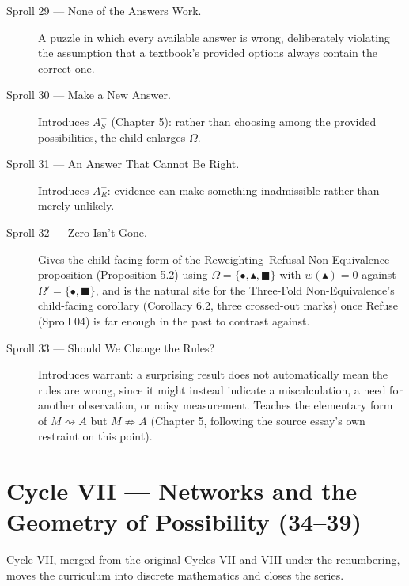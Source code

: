 \documentclass[11pt,twoside]{book}
\begin{document}
\begin{description}
\item[Sproll 29 --- None of the Answers Work.] A puzzle in which every available answer is wrong, deliberately violating the assumption that a textbook's provided options always contain the correct one.
\item[Sproll 30 --- Make a New Answer.] Introduces $A_S^+$ (Chapter 5): rather than choosing among the provided possibilities, the child enlarges $\Omega$.
\item[Sproll 31 --- An Answer That Cannot Be Right.] Introduces $A_R^-$: evidence can make something inadmissible rather than merely unlikely.
\item[Sproll 32 --- Zero Isn't Gone.] Gives the child-facing form of the Reweighting--Refusal Non-Equivalence proposition (Proposition 5.2) using $\Omega = \{\bullet, \blacktriangle, \blacksquare\}$ with $w(\blacktriangle) = 0$ against $\Omega' = \{\bullet, \blacksquare\}$, and is the natural site for the Three-Fold Non-Equivalence's child-facing corollary (Corollary 6.2, three crossed-out marks) once Refuse (Sproll 04) is far enough in the past to contrast against.
\item[Sproll 33 --- Should We Change the Rules?] Introduces warrant: a surprising result does not automatically mean the rules are wrong, since it might instead indicate a miscalculation, a need for another observation, or noisy measurement. Teaches the elementary form of $M \rightsquigarrow A$ but $M \not\Rightarrow A$ (Chapter 5, following the source essay's own restraint on this point).
\end{description}

\chapter{Cycle VII --- Networks and the Geometry of Possibility (34--39)}

Cycle VII, merged from the original Cycles VII and VIII under the renumbering, moves the curriculum into discrete mathematics and closes the series.
\end{document}
